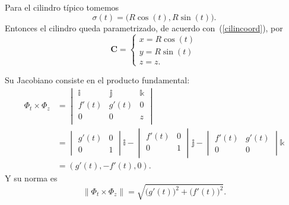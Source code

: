 \documentclass[mid,fleqn,draft,twoside]{notasdeclase}
\newcommand{\Norm}[1]{\left\lVert#1\right\rVert}
\renewcommand{\t}{\times}
\newcommand{\ihat}{\mathbb i}
\newcommand{\jhat}{\mathbb j}
\newcommand{\khat}{\mathbb k}
\begin{document}
\begin{ejem}[cilindro]
	Para el cilindro típico tomemos
	\[ \sigma(t) = \big(R\cos(t),R\sin(t)\big). \]
	Entonces el cilindro queda parametrizado, de acuerdo con~(\ref{cilincoord}), por
	\[ \bm C = \begin{cases}
	x = R\cos(t) \\
	y=R\sin(t) \\
	z=z.
	\end{cases} \]
	
	Su Jacobiano consiste en el producto fundamental:
	\begin{align*}
		\Phi_{t}\t\Phi_{z} &= \begin{vmatrix}
		\ihat& \jhat& \khat \\
		f'(t)& g'(t)& 0 \\
		0& 0& z\\
		\end{vmatrix} \\
		&= \begin{vmatrix}
		g'(t) & 0 \\
		0& 1
		\end{vmatrix}\ihat - \begin{vmatrix}
		f'(t)& 0\\
		0& 1\\
		\end{vmatrix}\jhat - \begin{vmatrix}
		f'(t)& g'(t) \\
		0& 0
		\end{vmatrix}\khat \\
		&=(g'(t),-f'(t),0).
	\end{align*} 
	Y su norma es
	\[ \Norm{\Phi_{t}\t\Phi_{z}} = \sqrt{\big(g'(t)\big)^2+\big(f'(t)\big)^2}. \]
\end{ejem}
\end{document}
